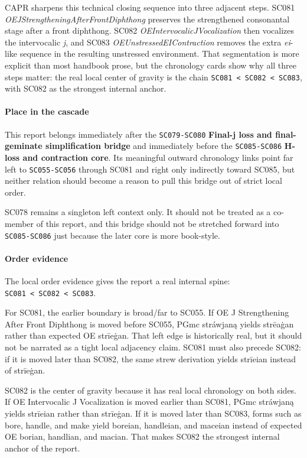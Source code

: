 \documentclass[
  british,
  a4paper,
]{article}
\begin{document}
CAPR sharpens this technical closing sequence into three adjacent steps.
SC081 \emph{OEJStrengtheningAfterFrontDiphthong} preserves the
strengthened consonantal stage after a front diphthong. SC082
\emph{OEIntervocalicJVocalization} then vocalizes the intervocalic
\emph{j}, and SC083 \emph{OEUnstressedEIContraction} removes the extra
\emph{ei}-like sequence in the resulting unstressed environment. That
segmentation is more explicit than most handbook prose, but the
chronology cards show why all three steps matter: the real local center
of gravity is the chain
\texttt{SC081\ \textless{}\ SC082\ \textless{}\ SC083}, with SC082 as
the strongest internal anchor.

\paragraph{Place in the cascade}\label{place-in-the-cascade-50}

This report belongs immediately after the \texttt{SC079-SC080}
\textbf{Final-j loss and final-geminate simplification bridge} and
immediately before the \texttt{SC085-SC086} \textbf{H-loss and
contraction core}. Its meaningful outward chronology links point far
left to \texttt{SC055-SC056} through SC081 and right only indirectly
toward SC085, but neither relation should become a reason to pull this
bridge out of strict local order.

SC078 remains a singleton left context only. It should not be treated as
a co-member of this report, and this bridge should not be stretched
forward into \texttt{SC085-SC086} just because the later core is more
book-style.

\paragraph{Order evidence}\label{order-evidence-50}

The local order evidence gives the report a real internal spine:
\texttt{SC081\ \textless{}\ SC082\ \textless{}\ SC083}.

For SC081, the earlier boundary is broad/far to SC055. If OE J
Strengthening After Front Diphthong is moved before SC055, PGmc
stráwjaną yields strēaġan rather than expected OE strīeġan. That left
edge is historically real, but it should not be narrated as a tight
local adjacency claim. SC081 must also precede SC082: if it is moved
later than SC082, the same strew derivation yields strīeian instead of
strīeġan.

SC082 is the center of gravity because it has real local chronology on
both sides. If OE Intervocalic J Vocalization is moved earlier than
SC081, PGmc stráwjaną yields strīeian rather than strīeġan. If it is
moved later than SC083, forms such as bore, handle, and make yield
boreian, handleian, and maceian instead of expected OE borian, handlian,
and macian. That makes SC082 the strongest internal anchor of the
report.
\end{document}
